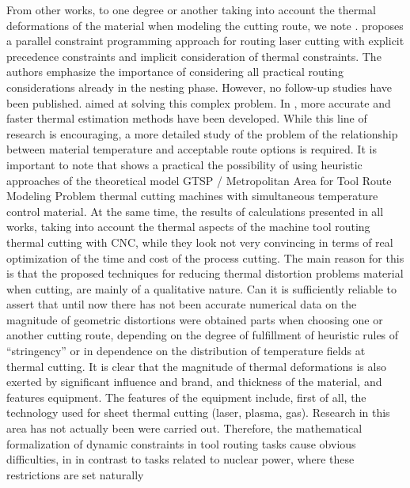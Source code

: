 \documentclass[numbers,sort&compress]{IntechOpen-Book}%
\begin{document}
From other works, to one degree or another taking into account the thermal deformations of the material when modeling the cutting route, we note
\cite{bibx:113,bibx:115,bibx:302}.
\cite{bibx:113} proposes a parallel constraint programming approach
for routing laser cutting with explicit precedence constraints
and implicit consideration of thermal constraints. The authors emphasize the importance of considering all
practical routing considerations already in the nesting phase.
However, no follow-up studies have been published.
aimed at solving this complex problem.
In \cite{bibx:114}, more accurate and faster thermal estimation methods have been developed. While this line of research is encouraging,
a more detailed study of the problem of the relationship between material temperature and acceptable route options is required.
It is important to note that \cite{bibx:100, bibx:116} shows a practical
the possibility of using heuristic approaches of the theoretical model
GTSP / Metropolitan Area for Tool Route Modeling Problem
thermal cutting machines with simultaneous temperature control
material.
At the same time, the results of calculations presented in all works,
taking into account the thermal aspects of the machine tool routing
thermal cutting with CNC, while they look not very convincing
in terms of real optimization of the time and cost of the process
cutting. The main reason for this is that the proposed
techniques for reducing thermal distortion problems
material when cutting, are mainly of a qualitative nature. Can
it is sufficiently reliable to assert that until now there has not been
accurate numerical data on the magnitude of geometric distortions were obtained
parts when choosing one or another cutting route, depending on
the degree of fulfillment of heuristic rules of ``stringency'' or in
dependence on the distribution of temperature fields at thermal
cutting. It is clear that the magnitude of thermal deformations is also exerted by
significant influence and brand, and thickness of the material, and features
equipment. The features of the equipment include, first of all,
the technology used for sheet thermal cutting (laser,
plasma, gas). Research in this area has not actually been
were carried out.
Therefore, the mathematical formalization of dynamic constraints in
tool routing tasks cause obvious difficulties, in
in contrast to tasks related to nuclear power, where these
restrictions are set naturally \cite{1,3}
\end{document}

